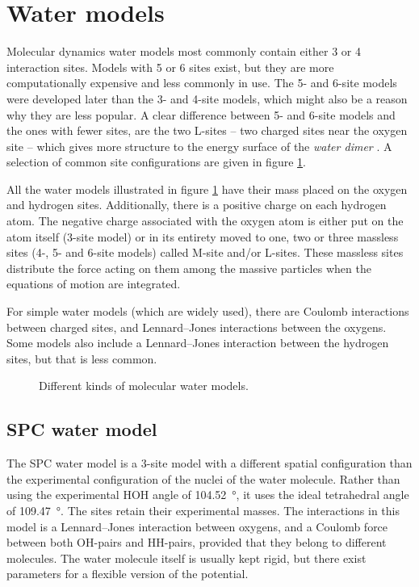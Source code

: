 \section{Water models}

Molecular dynamics water models most commonly contain either 3 or 4 interaction sites. Models with 5 or 6 sites exist, but they are more computationally expensive and less commonly in use. The 5- and 6-site models were developed later than the 3- and 4-site models, which might also be a reason why they are less popular. A clear difference between 5- and 6-site models and the ones with fewer sites, are the two L-sites -- two charged sites near the oxygen site -- which gives more structure to the energy surface of the \emph{water dimer} \cite{Mahoney2000}. A selection of common site configurations are given in figure \ref{fig:water_models}. 

All the water models illustrated in figure \ref{fig:water_models} have their mass placed on the oxygen and hydrogen sites. Additionally, there is a positive charge on each hydrogen atom. The negative charge associated with the oxygen atom is either put on the atom itself (3-site model) or in its entirety moved to one, two or three massless sites (4-, 5- and 6-site models) called M-site and/or L-sites. These massless sites distribute the force acting on them among the massive particles when the equations of motion are integrated.

For simple water models (which are widely used), there are Coulomb interactions between charged sites, and Lennard--Jones interactions between the oxygens. Some models also include a Lennard--Jones interaction between the hydrogen sites, but that is less common.


\begin{figure}
\centering
{}
\qquad
{}\qquad
{}\qquad
{}
\chemnameinit{}
\caption{Different kinds of molecular water models.}
\label{fig:water_models}
\end{figure}

\subsection{SPC water model}
The SPC water model \cite{berendsen1981interaction} is a 3-site model with a different spatial configuration than the experimental configuration of the nuclei of the water molecule. Rather than using the experimental HOH angle of \SI{104.52}{\degree}, it uses the ideal tetrahedral angle of \SI{109.47}{\degree}. The sites retain their experimental masses. The interactions in this model is a Lennard--Jones interaction between oxygens, and a Coulomb force between both OH-pairs and HH-pairs, provided that they belong to different molecules. The water molecule itself is usually kept rigid, but there exist parameters for a flexible version of the potential.

